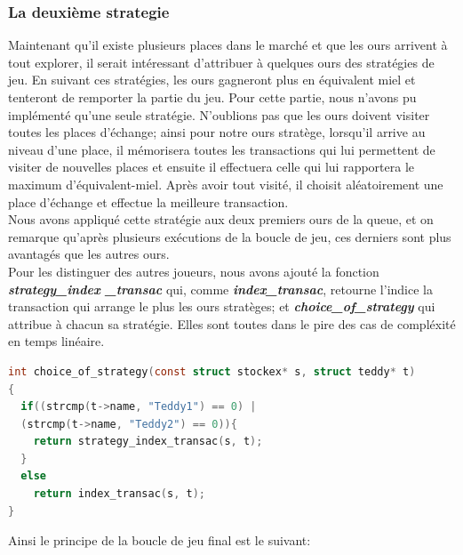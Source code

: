 \documentclass[a4paper,12pt]{article}
\begin{document}
    \subsubsection{La deuxième strategie}
Maintenant qu'il existe plusieurs places dans le marché et que les ours arrivent à tout explorer, il serait intéressant d'attribuer à quelques ours des stratégies de jeu. En suivant ces stratégies, les ours gagneront plus en équivalent miel et tenteront de remporter la partie du jeu.
Pour cette partie, nous n'avons pu implémenté qu'une seule stratégie. 
N'oublions pas que les ours doivent visiter toutes les places d'échange; ainsi pour notre ours stratège, lorsqu'il arrive au niveau d'une place, il mémorisera toutes les transactions qui lui permettent de visiter de nouvelles places et ensuite il effectuera celle qui lui rapportera le maximum d'équivalent-miel. Après avoir tout visité, il choisit aléatoirement une place d'échange et effectue la meilleure transaction.\\
Nous avons appliqué cette stratégie aux deux premiers ours de la queue, et on remarque qu'après plusieurs exécutions de la boucle de jeu, ces derniers sont plus avantagés que les autres ours.\\
Pour les distinguer des autres joueurs, nous avons ajouté la fonction \emph{\textbf{strategy\_index
\_transac}} qui, comme \emph{\textbf{index\_transac}}, retourne l'indice la transaction qui arrange le plus les ours stratèges; et \emph{\textbf{choice\_of\_strategy}} qui attribue à chacun sa stratégie. Elles sont toutes dans le pire des cas de compléxité en temps linéaire.
\newline
\begin{lstlisting}[language={C},captionpos=b, frame=single, caption= Choix des stratégies]
int choice_of_strategy(const struct stockex* s, struct teddy* t)
{
  if((strcmp(t->name, "Teddy1") == 0) | 
  (strcmp(t->name, "Teddy2") == 0)){
    return strategy_index_transac(s, t);
  }
  else
    return index_transac(s, t);
}
\end{lstlisting}
Ainsi le principe de la boucle de jeu final est le suivant:
\end{document}

